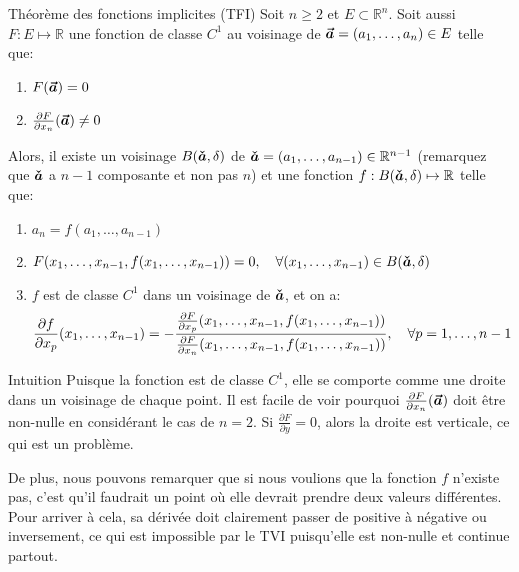 \documentclass[a4paper]{article}
\begin{document}
\begin{parag}{Théorème des fonctions implicites (TFI)}
    Soit $n \geq 2$ et $E \subset \mathbb{R}^n$. Soit aussi $F: E \mapsto \mathbb{R}$ une fonction de classe $C^1$ au voisinage de $\bvec{a} = \left(a_1, \ldots, a_n\right) \in E$ telle que:
    \begin{enumerate}
        \item $F\left(\bvec{a}\right) = 0$
        \item $\frac{\partial F}{\partial x_n}\left(\bvec{a}\right)\neq 0$
    \end{enumerate}

    Alors, il existe un voisinage $B\left(\bcheck{a}, \delta\right)$ de $\bcheck{a} = \left(a_1, \ldots, a_{n-1}\right) \in \mathbb{R}^{n-1}$ (remarquez que $\bm{\check{a}}$ a $n-1$ composante et non pas $n$) et une fonction $f: B\left(\bcheck{a}, \delta\right) \mapsto\mathbb{R}$ telle que:
    \begin{enumerate}
        \item $a_n = f\left(a_1, \ldots, a_{n-1}\right)$
        \item $F\left(x_1, \ldots, x_{n-1}, f\left(x_1, \ldots, x_{n-1}\right)\right) = 0, \mathspace \forall \left(x_1, \ldots, x_{n-1}\right) \in B\left(\bcheck{a}, \delta\right)$
        \item $f$ est de classe $C^1$ dans un voisinage de $\bm{\check{a}}$, et on a:
            \[\frac{\partial f}{\partial x_p}\left(x_1, \ldots, x_{n-1}\right) = - \frac{\frac{\partial F}{\partial x_p}\left(x_1, \ldots, x_{n-1}, f\left(x_1, \ldots, x_{n-1}\right)\right)}{\frac{\partial F}{\partial x_n}\left(x_1, \ldots, x_{n-1}, f\left(x_1, \ldots, x_{n-1}\right)\right)}, \mathspace\forall p = 1, \ldots, n-1\]

    \end{enumerate}

    \begin{subparag}{Intuition}
        Puisque la fonction est de classe $C^1$, elle se comporte comme une droite dans un voisinage de chaque point. Il est facile de voir pourquoi $\frac{\partial F}{\partial x_n}\left(\bvec{a}\right)$ doit être non-nulle en considérant le cas de $n = 2$. Si $\frac{\partial F}{\partial y} = 0$, alors la droite est verticale, ce qui est un problème.

        De plus, nous pouvons remarquer que si nous voulions que la fonction $f$ n'existe pas, c'est qu'il faudrait un point où elle devrait prendre deux valeurs différentes. Pour arriver à cela, sa dérivée doit clairement passer de positive à négative ou inversement, ce qui est impossible par le TVI puisqu'elle est non-nulle et continue partout.

    \end{subparag}
\end{parag}
\end{document}
